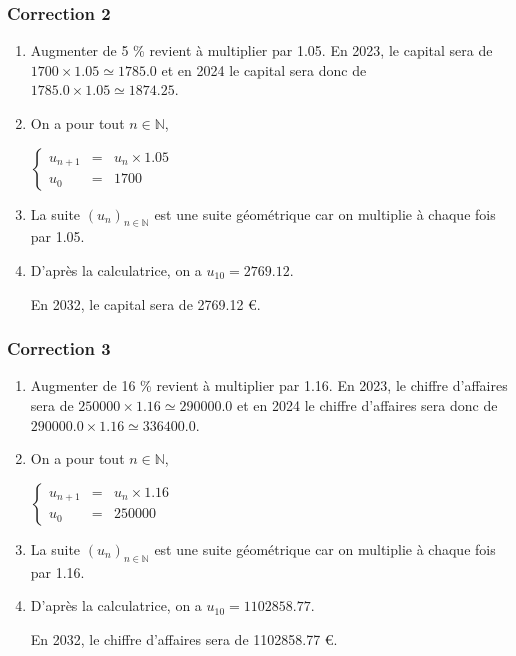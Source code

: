 \documentclass[15pt, mathserif]{beamer}
\newcommand{\N}{\mathbb{N}}			%
\newcommand{\st}[1]{$(#1_n)_{n \in \N}$}
\begin{document}
\begin{frame}
\vspace{-10mm}
	\frametitle{Correction 2}
\begin{enumerate} 
 	 \item Augmenter de 5 \% revient à multiplier par  1.05. En 2023, le capital sera de $1700 \times  1.05\simeq 1785.0$ et en 2024 le capital sera donc de  $1785.0 \times  1.05\simeq 1874.25$.  
 	 \item On a pour tout $n \in \N$, 
 
 \hfil$\left\{\begin{array}{rcl} 
 u_{n+1} & = & u_n \times  1.05\\ u_0 & = &  1700\end{array} \right.$ 
 	 \item La suite \st{u} est une suite géométrique car on multiplie à chaque fois par  1.05. 
 	 \item D'après la calculatrice, on a $u_{10}=2769.12$. 
 
 En 2032, le capital sera de 2769.12 \euro. 
 \end{enumerate} 
 
 \end{frame}


\begin{frame}
\vspace{-10mm}
	\frametitle{Correction 3}
\begin{enumerate} 
 	 \item Augmenter de 16 \% revient à multiplier par  1.16. En 2023, le chiffre d'affaires sera de $250000 \times  1.16\simeq 290000.0$ et en 2024 le chiffre d'affaires sera donc de  $290000.0 \times  1.16\simeq 336400.0$.  
 	 \item On a pour tout $n \in \N$, 
 
 \hfil$\left\{\begin{array}{rcl} 
 u_{n+1} & = & u_n \times  1.16\\ u_0 & = &  250000\end{array} \right.$ 
 	 \item La suite \st{u} est une suite géométrique car on multiplie à chaque fois par  1.16. 
 	 \item D'après la calculatrice, on a $u_{10}=1102858.77$. 
 
 En 2032, le chiffre d'affaires sera de 1102858.77 \euro. 
 \end{enumerate} 
 
 \end{frame}
\end{document}
